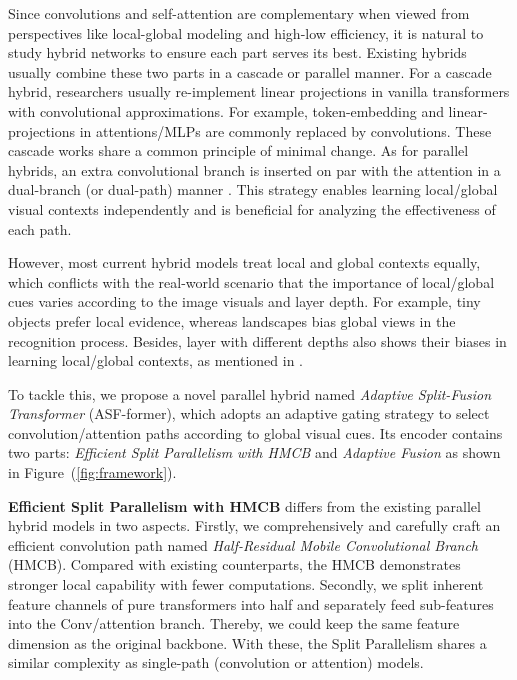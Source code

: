 \documentclass[lettersize,journal]{IEEEtran}
\begin{document}
Since convolutions and self-attention are complementary when viewed from perspectives like local-global modeling and high-low efficiency, it is natural to study hybrid networks to ensure each part serves its best. Existing hybrids usually combine these two parts in a cascade or parallel manner. For a cascade hybrid, researchers usually re-implement linear projections in vanilla transformers with convolutional approximations. For example, token-embedding \cite{Chen2021VisformerTV,Hassani2021EscapingTB,Mehta2021MobileViTLG,Wu2021CvTIC,Yan2021ConTNetWN,Yang2021FocalSF,Yuan2021IncorporatingCD} and linear-projections \cite{Chen2021VisformerTV,He2021PruningSI,Mehta2021MobileViTLG,Wu2021CvTIC,Yan2021ConTNetWN,Yuan2021IncorporatingCD} in attentions/MLPs are commonly replaced by convolutions. These cascade works share a common principle of minimal change. As for parallel hybrids, an extra convolutional branch is inserted on par with the attention in a dual-branch (or dual-path) manner \cite{Chen2021MobileFormerBM,Pan2021OnTI,Peng2021ConformerLF,Xu2021ViTAEVT}. This strategy enables learning local/global visual contexts independently and is beneficial for analyzing the effectiveness of each path.

However, most current hybrid models treat local and global contexts equally, which conflicts with the real-world scenario that the importance of local/global cues varies according to the image visuals and layer depth. For example, tiny objects prefer local evidence, whereas landscapes bias global views in the recognition process. Besides, layer with different depths also shows their biases in learning local/global contexts, as mentioned in \cite{Pan2021OnTI}.

To tackle this, we propose a novel parallel hybrid named {\textit{Adaptive Split-Fusion Transformer}} (ASF-former), which adopts an adaptive gating strategy to select convolution/attention paths according to global visual cues. Its encoder contains two parts: \textit{Efficient Split Parallelism with HMCB} and \textit{Adaptive Fusion} as shown in Figure~(\ref{fig:framework}).

\textbf{Efficient Split Parallelism with HMCB} differs from the existing parallel hybrid models in two aspects. Firstly, we comprehensively and carefully craft an efficient convolution path named \textit{Half-Residual Mobile Convolutional Branch} (HMCB). Compared with existing counterparts, the HMCB demonstrates stronger local capability with fewer computations. Secondly, we split inherent feature channels of pure transformers into half and separately feed sub-features into the Conv/attention branch. Thereby, we could keep the same feature dimension as the original backbone. With these, the Split Parallelism shares a similar complexity as single-path (convolution or attention) models.
\end{document}
